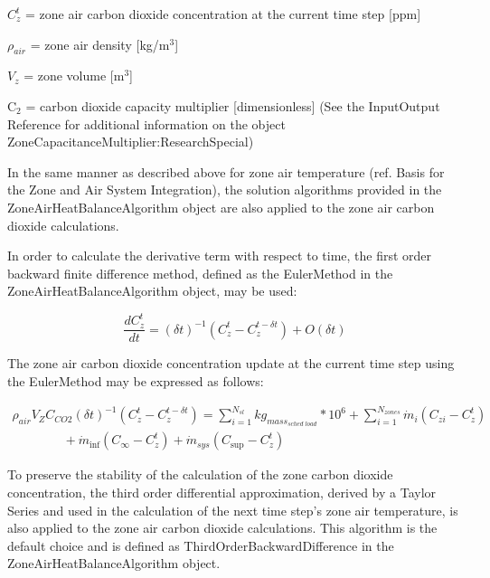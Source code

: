 \(C_z^t\) = zone air carbon dioxide concentration at the current time step {[}ppm{]}

\({\rho_{air}}\) = zone air density {[}kg/m\(^{3}\){]}

\({V_z}\) = zone volume {[}m\(^{3}\){]}

C\(_{2}\) = carbon dioxide capacity multiplier {[}dimensionless{]} (See the InputOutput Reference for additional information on the object ZoneCapacitanceMultiplier:ResearchSpecial)

In the same manner as described above for zone air temperature (ref. Basis for the Zone and Air System Integration), the solution algorithms provided in the ZoneAirHeatBalanceAlgorithm object are also applied to the zone air carbon dioxide calculations.

In order to calculate the derivative term with respect to time, the first order backward finite difference method, defined as the EulerMethod in the ZoneAirHeatBalanceAlgorithm object, may be used:

\begin{equation}
\frac{{dC_z^t}}{{dt}} = {\left( {\delta t} \right)^{ - 1}}(C_z^t - C_z^{t - \delta t}) + O(\delta t)
\end{equation}

The zone air carbon dioxide concentration update at the current time step using the EulerMethod may be expressed as follows:

\begin{equation}
\begin{array}{l}
{\rho_{air}}{V_Z}{C_{CO2}}{\left( {\delta t} \right)^{ - 1}}\left( {C_z^t - C_z^{t - \delta t}} \right) = \sum\limits_{i = 1}^{{N_{sl}}} {k{g_{mas{s_{sched\;load}}}}} *{10^6} + \sum\limits_{i = 1}^{{N_{zones}}} {{{\dot m}_i}} \left( {{C_{zi}} - C_z^t} \right) \\
\quad \quad \quad \quad + {\dot m_{\inf }}\left( {{C_\infty } - C_z^t} \right) + {\dot m_{sys}}\left( {{C_{\sup }} - C_z^t} \right)
\end{array}
\end{equation}

To preserve the stability of the calculation of the zone carbon dioxide concentration, the third order differential approximation, derived by a Taylor Series and used in the calculation of the next time step's zone air temperature, is also applied to the zone air carbon dioxide calculations. This algorithm is the default choice and is defined as ThirdOrderBackwardDifference in the ZoneAirHeatBalanceAlgorithm object.


